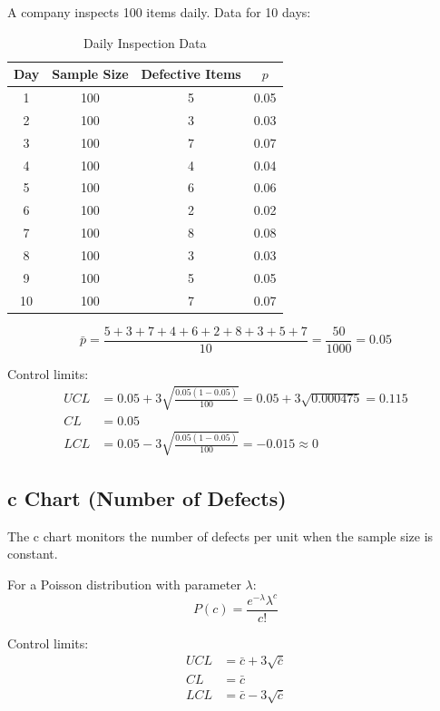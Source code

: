 \documentclass[twoside]{book}
\begin{document}
A company inspects 100 items daily. Data for 10 days:

\begin{table}[H]
\centering
\caption{Daily Inspection Data}
\begin{tabular}{cccc}
\toprule
Day & Sample Size & Defective Items & $p$ \\
\midrule
1 & 100 & 5 & 0.05 \\
2 & 100 & 3 & 0.03 \\
3 & 100 & 7 & 0.07 \\
4 & 100 & 4 & 0.04 \\
5 & 100 & 6 & 0.06 \\
6 & 100 & 2 & 0.02 \\
7 & 100 & 8 & 0.08 \\
8 & 100 & 3 & 0.03 \\
9 & 100 & 5 & 0.05 \\
10 & 100 & 7 & 0.07 \\
\bottomrule
\end{tabular}
\end{table}

$$\bar{p} = \frac{5+3+7+4+6+2+8+3+5+7}{10} = \frac{50}{1000} = 0.05$$

Control limits:
\begin{align}
UCL &= 0.05 + 3\sqrt{\frac{0.05(1-0.05)}{100}} = 0.05 + 3\sqrt{0.000475} = 0.115\\
CL &= 0.05\\
LCL &= 0.05 - 3\sqrt{\frac{0.05(1-0.05)}{100}} = -0.015 \approx 0
\end{align}

\subsection{c Chart (Number of Defects)}

The c chart monitors the number of defects per unit when the sample size is constant.

For a Poisson distribution with parameter $\lambda$:
$$P(c) = \frac{e^{-\lambda}\lambda^c}{c!}$$

Control limits:
\begin{align}
UCL &= \bar{c} + 3\sqrt{\bar{c}}\\
CL &= \bar{c}\\
LCL &= \bar{c} - 3\sqrt{\bar{c}}
\end{align}
\end{document}
